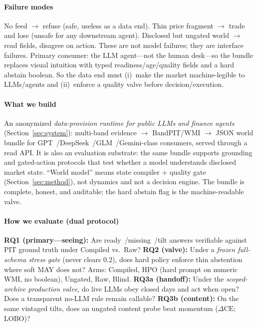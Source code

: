 \documentclass[sigconf,anonymous]{acmart}
\theoremstyle{acmdefinition}%
\theoremstyle{acmplain}%
\begin{document}
\paragraph{Failure modes}
No feed \(\to\) refuse (safe, useless as a data end).
Thin price fragment \(\to\) trade and lose (unsafe for any downstream agent).
Disclosed but ungated world \(\to\) read fields, disagree on action.
These are not model failures; they are interface failures.
Primary consumer: the LLM agent---not the human desk---so the bundle replaces visual intuition with typed readiness/age/quality fields and a hard abstain boolean.
So the data end must (i)~make the market machine-legible to LLMs/agents and (ii)~enforce a quality valve before decision/execution.

\paragraph{What we build}
An anonymized \emph{data-provision runtime for public LLMs and finance agents} (Section~\ref{sec:system}): multi-band evidence \(\to\) BandPIT/WMI \(\to\) JSON world bundle for GPT~/DeepSeek~/GLM~/Gemini-class consumers, served through a read API.
It is also an evaluation substrate: the same bundle supports grounding and gated-action protocols that test whether a model understands disclosed market state.
``World model'' means state compiler + quality gate (Section~\ref{sec:method}), not dynamics and not a decision engine.
The bundle is complete, honest, and auditable; the hard abstain flag is the machine-readable valve.

\paragraph{How we evaluate (dual protocol)}
\textbf{RQ1 (primary---seeing):} Are ready~/missing~/tilt answers verifiable against PIT ground truth under Compiled vs.\ Raw?
\textbf{RQ2 (valve):} Under a \emph{frozen full-schema stress gate} (never clears \(0.2\)), does hard policy enforce thin abstention where soft MAY does not?
Arms: Compiled, HPO (hard prompt on numeric WMI, no boolean), Ungated, Raw, Blind.
\textbf{RQ3a (handoff):} Under the \emph{scoped-archive production valve}, do live LLMs obey closed days and act when open? Does a transparent no-LLM rule remain callable?
\textbf{RQ3b (content):} On the same vintaged tilts, does an ungated content probe beat momentum (\(\Delta\mathrm{CE}\); LOBO)?
\end{document}
